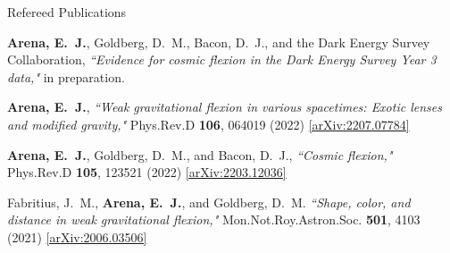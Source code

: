 \documentclass{resume} %
\begin{document}
\begin{rSection}{Refereed Publications}

\begin{etaremune}
\item \textbf{{Arena}, E.~J.}, {Goldberg}, D.~M., {Bacon}, D.~J., and the Dark Energy Survey Collaboration, \textit{``Evidence for cosmic flexion in the Dark Energy Survey Year 3 data,"} in preparation.

\item \textbf{{Arena}, E.~J.}, \textit{``Weak gravitational flexion in various spacetimes: Exotic lenses and modified gravity,"} Phys.Rev.D \textbf{106}, 064019 (2022) \href{https://arxiv.org/abs/2207.07784}{[arXiv:2207.07784]}
    
\item \textbf{{Arena}, E.~J.}, {Goldberg}, D.~M., and {Bacon}, D.~J., \textit{``Cosmic flexion,"} Phys.Rev.D \textbf{105}, 123521 (2022) \href{https://arxiv.org/abs/2203.12036}{[arXiv:2203.12036]}
  
\item {Fabritius}, J.~M., \textbf{{Arena}, E.~J.}, and {Goldberg}, D.~M. \textit{``Shape, color, and distance in weak gravitational flexion,"} Mon.Not.Roy.Astron.Soc. \textbf{501}, 4103 (2021) \href{https://arxiv.org/abs/2006.03506}{[arXiv:2006.03506]}
\end{etaremune}

\end{rSection}

\end{document}
